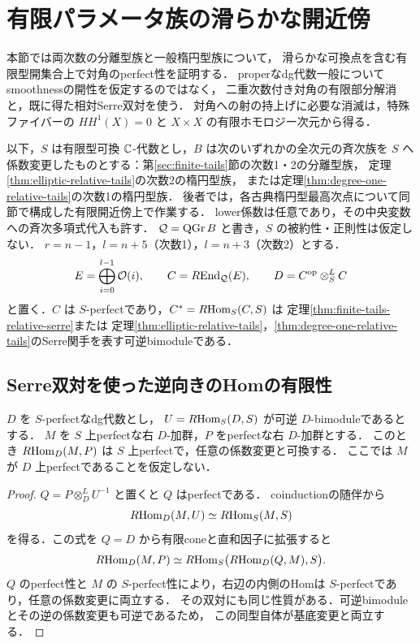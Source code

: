\section{有限パラメータ族の滑らかな開近傍}
\label{sec:finite-smoothness}

本節では両次数の分離型族と一般楕円型族について，
滑らかな可換点を含む有限型開集合上で対角のperfect性を証明する．
properなdg代数一般についてsmoothnessの開性を仮定するのではなく，
二重次数付き対角の有限部分解消と，既に得た相対Serre双対を使う．
対角への射の持上げに必要な消滅は，特殊ファイバーの
$HH^1(X)=0$ と $X\times X$ の有限ホモロジー次元から得る．

以下，$S$ は有限型可換 $\mathbb C$-代数とし，$B$ は次のいずれかの全次元の斉次族を
$S$ へ係数変更したものとする：第\ref{sec:finite-tails}節の次数1・2の分離型族，
定理\ref{thm:elliptic-relative-tails}の次数2の楕円型族，
または定理\ref{thm:degree-one-relative-tails}の次数1の楕円型族．
後者では，各古典楕円型最高次点について同節で構成した有限開近傍上で作業する．
lower係数は任意であり，その中央変数への斉次多項式代入も許す．
$\mathcal Q=\operatorname{QGr} B$ と書き，$S$ の被約性・正則性は仮定しない．
$r=n-1$，$l=n+5$（次数1），$l=n+3$（次数2）とする．
\[
 E=\bigoplus_{i=0}^{l-1}\mathcal O(i),\qquad
 C=R\!\operatorname{End}_{\mathcal Q}(E),\qquad
 D=C^{\mathrm{op}}\otimes_S^L C
\]
と置く．$C$ は $S$-perfectであり，$C^*=R\!\operatorname{Hom}_S(C,S)$ は
定理\ref{thm:finite-tails-relative-serre}または
定理\ref{thm:elliptic-relative-tails}，\ref{thm:degree-one-relative-tails}のSerre関手を表す可逆bimoduleである．

\subsection{Serre双対を使った逆向きのHomの有限性}

\begin{lemma}\label{lem:serre-pseudoperfect-to-perfect}
$D$ を $S$-perfectなdg代数とし，
$U=R\!\operatorname{Hom}_S(D,S)$ が可逆 $D$-bimoduleであるとする．
$M$ を $S$ 上perfectな右 $D$-加群，$P$ をperfectな右 $D$-加群とする．
このとき $R\!\operatorname{Hom}_D(M,P)$ は $S$ 上perfectで，任意の係数変更と可換する．
ここでは $M$ が $D$ 上perfectであることを仮定しない．
\end{lemma}
\begin{proof}
$Q=P\otimes_D^L U^{-1}$ と置くと $Q$ はperfectである．
coinductionの随伴から
\[
 R\!\operatorname{Hom}_D(M,U)\simeq R\!\operatorname{Hom}_S(M,S)
\]
を得る．この式を $Q=D$ から有限coneと直和因子に拡張すると
\begin{equation}
 R\!\operatorname{Hom}_D(M,P)
 \simeq R\!\operatorname{Hom}_S\bigl(R\!\operatorname{Hom}_D(Q,M),S\bigr).
 \label{eq:serre-pseudoperfect-hom}
\end{equation}
$Q$ のperfect性と $M$ の $S$-perfect性により，右辺の内側のHomは
$S$-perfectであり，任意の係数変更に両立する．
その双対にも同じ性質がある．可逆bimoduleとその逆の係数変更も可逆であるため，
この同型自体が基底変更と両立する．
\end{proof}

